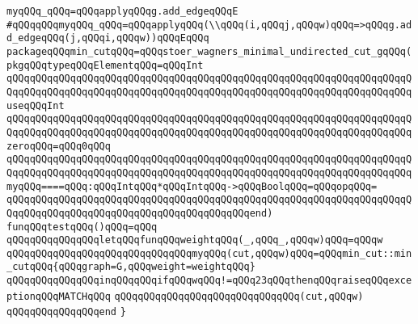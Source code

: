 \verb|myqQQq_qQQq=qQQqapplyqQQqg.add_edgeqQQqE|\newline
\verb|#qQQqqQQqmyqQQq_qQQq=qQQqapplyqQQq(\\qQQq(i,qQQqj,qQQqw)qQQq=>qQQqg.add_edgeqQQq(j,qQQqi,qQQqw))qQQqEqQQq|\newline
\newline
\verb|packageqQQqmin_cutqQQq=qQQqstoer_wagners_minimal_undirected_cut_gqQQq(pkgqQQqtypeqQQqElementqQQq=qQQqInt|\newline
\verb|qQQqqQQqqQQqqQQqqQQqqQQqqQQqqQQqqQQqqQQqqQQqqQQqqQQqqQQqqQQqqQQqqQQqqQQqqQQqqQQqqQQqqQQqqQQqqQQqqQQqqQQqqQQqqQQqqQQqqQQqqQQqqQQqqQQqqQQqqQQquseqQQqInt|\newline
\verb|qQQqqQQqqQQqqQQqqQQqqQQqqQQqqQQqqQQqqQQqqQQqqQQqqQQqqQQqqQQqqQQqqQQqqQQqqQQqqQQqqQQqqQQqqQQqqQQqqQQqqQQqqQQqqQQqqQQqqQQqqQQqqQQqqQQqqQQqqQQqzeroqQQq=qQQq0qQQq|\newline
\verb|qQQqqQQqqQQqqQQqqQQqqQQqqQQqqQQqqQQqqQQqqQQqqQQqqQQqqQQqqQQqqQQqqQQqqQQqqQQqqQQqqQQqqQQqqQQqqQQqqQQqqQQqqQQqqQQqqQQqqQQqqQQqqQQqqQQqqQQqqQQqmyqQQq====qQQq:qQQqIntqQQq*qQQqIntqQQq->qQQqBoolqQQq=qQQqopqQQq=|\newline
\verb|qQQqqQQqqQQqqQQqqQQqqQQqqQQqqQQqqQQqqQQqqQQqqQQqqQQqqQQqqQQqqQQqqQQqqQQqqQQqqQQqqQQqqQQqqQQqqQQqqQQqqQQqqQQqqQQqend)|\newline
\newline
\verb|funqQQqtestqQQq()qQQq=qQQq|\newline
\verb|qQQqqQQqqQQqqQQqletqQQqfunqQQqweightqQQq(_,qQQq_,qQQqw)qQQq=qQQqw|\newline
\verb|qQQqqQQqqQQqqQQqqQQqqQQqqQQqqQQqmyqQQq(cut,qQQqw)qQQq=qQQqmin_cut::min_cutqQQq{qQQqgraph=G,qQQqweight=weightqQQq}|\newline
\verb|qQQqqQQqqQQqqQQqinqQQqqQQqifqQQqwqQQq!=qQQq23qQQqthenqQQqraiseqQQqexceptionqQQqMATCHqQQq|\newline
\verb|qQQqqQQqqQQqqQQqqQQqqQQqqQQqqQQq(cut,qQQqw)|\newline
\verb|qQQqqQQqqQQqqQQqend|\newline
\newline
\verb|}|\newline

